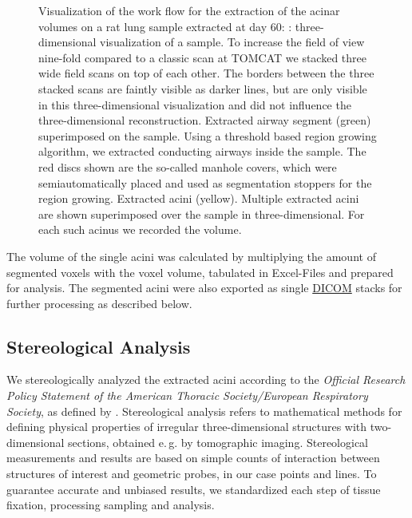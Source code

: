 \documentclass[%
	paper=a4,%
	abstract=true,%
	]{scrartcl}
\newlength\imagescale		%
\newcommand{\eg}{e.\,g.\xspace}
\begin{document}
\begin{figure}
{%
		\label{subfig:extracted acini}%
		}
	\caption{Visualization of the work flow for the extraction of the acinar volumes on a rat lung sample extracted at day 60: %
		: three-dimensional visualization of a sample. To increase the field of view nine-fold compared to a classic scan at TOMCAT we stacked three wide field scans on top of each other. The borders between the three stacked scans are faintly visible as darker lines, but are only visible in this three-dimensional visualization and did not influence the three-dimensional reconstruction. %
		 Extracted airway segment (green) superimposed on the sample. Using a threshold based region growing algorithm, we extracted conducting airways inside the sample. The red discs shown are the so-called manhole covers, which were semiautomatically placed and used as segmentation stoppers for the region growing. %
		 Extracted acini (yellow). Multiple extracted acini are shown superimposed over the sample in three-dimensional. For each such acinus we recorded the volume.%
		}
	\label{fig:workflow}
\end{figure}

The volume of the single acini was calculated by multiplying the amount of segmented voxels with the voxel volume, tabulated in Excel-Files and prepared for analysis. The segmented acini were also exported as single \href{https://secure.wikimedia.org/wikipedia/en/w/index.php?title=Digital_Imaging_and_Communications_in_Medicine&oldid=415023605}{DICOM} stacks for further processing as described below.

\subsection{Stereological Analysis}
We stereologically analyzed the extracted acini according to the \emph{Official Research Policy Statement of the American Thoracic Society/European Respiratory Society}, as defined by \citet{Hsia2010}. Stereological analysis refers to mathematical methods for defining physical properties of irregular three-dimensional structures with two-dimensional sections, obtained \eg by tomographic imaging. Stereological measurements and results are based on simple counts of interaction between structures of interest and geometric probes, in our case points and lines. To guarantee accurate and unbiased results, we standardized each step of tissue fixation, processing sampling and analysis.
\end{document}
